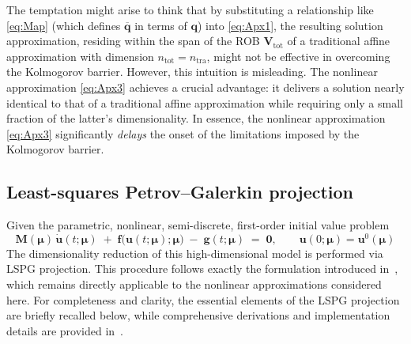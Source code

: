 \documentclass[preprint,10pt]{elsarticle}
\begin{document}
The temptation might arise to think that by substituting a relationship like \eqref{eq:Map} (which defines $\overline{\mathbf{q}}$ in terms of $\mathbf{q}$) into \eqref{eq:Apx1}, the 
resulting solution approximation, residing within the span of the ROB $\mathbf{V}_\text{tot}$ of a traditional affine approximation with dimension $n_\text{tot} = n_\text{tra}$, might not be 
effective in overcoming the Kolmogorov barrier. However, this intuition is misleading. The nonlinear approximation \eqref{eq:Apx3} achieves a crucial advantage: it delivers a solution
nearly identical to that of a traditional affine approximation while requiring only a small fraction of the latter's dimensionality. In essence, the nonlinear approximation 
\eqref{eq:Apx3} significantly \textit{delays} the onset of the limitations imposed by the Kolmogorov barrier.

\color{blue}


\subsection{Least-squares Petrov--Galerkin projection}
\label{sec:lspg}

Given the parametric, nonlinear, semi-discrete, first-order initial value problem
\begin{equation}
  \mathbf M(\boldsymbol\mu)\,\dot{\mathbf u}(t;\boldsymbol\mu)
 \;+\;
  \mathbf f\!\bigl(\mathbf u(t;\boldsymbol\mu);\boldsymbol\mu\bigr)
 \;-\;
  \mathbf g(t;\boldsymbol\mu)
 \;=\;\mathbf 0,
 \qquad
  \mathbf u(0;\boldsymbol\mu)=\mathbf u^{0}(\boldsymbol\mu)
  \label{eq:HDM_model_with_ic}
\end{equation}
The dimensionality reduction of this high-dimensional model is performed via LSPG projection. This procedure follows exactly the formulation introduced in~\cite{barnett2023neural}, which remains directly applicable to the nonlinear approximations considered here. For completeness and clarity, the essential elements of the LSPG projection are briefly recalled below, while comprehensive derivations and implementation details are provided in~\cite{barnett2023neural}.
\end{document}
